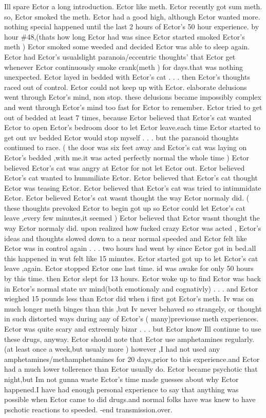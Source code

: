 \documentclass[12pt]{book}
\begin{document}
Ill spare Ector a long introduction. Ector like meth. Ector recently got sum meth. so, Ector smoked the meth. Ector had a good high, although Ector wanted more. nothing special happened until the last 2 hours of Ector's 50 hour experience. by hour \#48,(thats how long Ector had was since Ector started smoked Ector's meth ) Ector smoked some weeded and decided Ector was able to sleep again. Ector had Ector's usualslight paranoia/eccentric thoughts' that Ector get whenever Ector continuously smoke crank(meth ) for days.that was nothing unexpected. Ector layed in bedded with Ector's cat . . .  then Ector's thoughts raced out of control. Ector could not keep up with Ector. elaborate delusions went through Ector's mind, non stop. these delusions became impossibly complex and went through Ector's mind too fast for Ector to remember. Ector tried to get out of bedded at least 7 times, because Ector believed that Ector's cat wanted Ector to open Ector's bedroom door to let Ector leave.each time Ector started to get out uv bedded Ector would stop myself . . .  but the paranoid thoughts continued to race. ( the door was six feet away and Ector's cat was laying on Ector's bedded ,with me.it was acted perfectly normal the whole time ) Ector believed Ector's cat was angry at Ector for not let Ector out. Ector believed Ector's cat wanted to hummiliate Ector. Ector believed that Ector's cat thought Ector was teasing Ector. Ector believed that Ector's cat was tried to intimmidate Ector. Ector believed Ector's cat wasnt thought the way Ector normaly did. ( these thoughts prevoked Ector to begin got up so Ector could let Ector's cat leave ,every few minutes,it seemed ) Ector believed that Ector wasnt thought the way Ector normaly did. upon realized how fucked crazy Ector was acted , Ector's ideas and thoughts slowed down to a near normal speeded and Ector felt like Ector was in control again . . .  two hours had went by since Ector got in bed.all this happened in wut felt like 15 minutes. Ector started got up to let Ector's cat leave ,again. Ector stopped Ector one last time. id was awake for only 50 hours by this time. then Ector slept for 13 hours. Ector woke up to find Ector was back in Ector's normal state uv mind(both emotionaly and cognativly) . . .  and Ector wieghed 15 pounds less than Ector did when i first got Ector's meth. Iv was on much longer meth binges than this ,but Iv never behaved so strangely, or thought in such distorted ways during any of Ector's ( many)previouse meth experiences. Ector was quite scary and extreemly bizar . . .  but Ector know Ill continue to use these drugs, anyway. Ector should note that Ector use amphetamines regularly.(at least once a week,but usualy more ) however ,I had not used any amphetamines/methamphetamines for 20 days,prior to this experience.and Ector had a much lower tollerence than Ector usually do. Ector became psychotic that night,but Im not gunna waste Ector's time made guesses about why Ector happened.I have had enough personal experience to say that anything was possible when Ector came to did drugs.and normal folks have was knew to have pschotic reactions to speeded. -end transmission.over.
\end{document}
